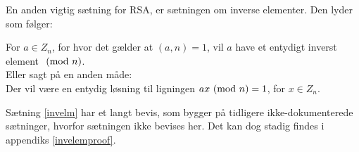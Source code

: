 En anden vigtig sætning for RSA, er sætningen om inverse elementer. Den lyder som følger:

\begin{sent}
    \label{invelm}
    For \(a \in Z_n\), for hvor det gælder at \((a, n) = 1\), vil \(a\) have et entydigt inverst element \(\ (\mathrm{mod}\ n)\).\cite[93]{krypto}\\
    Eller sagt på en anden måde:\\
    Der vil være en entydig løsning til ligningen \(a x \ (\mathrm{mod}\ n) = 1\), for \(x \in Z_n\).
\end{sent}

Sætning \ref{invelm} har et langt bevis, som bygger på tidligere ikke-dokumenterede sætninger, hvorfor sætningen ikke bevises her. Det kan dog stadig findes i appendiks \ref{invelemproof}.
